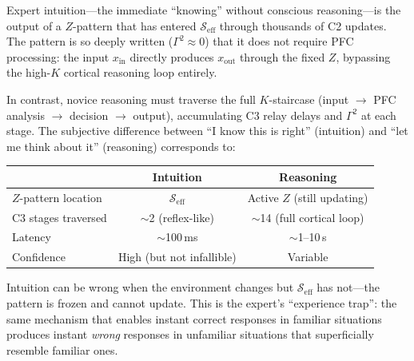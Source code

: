 \documentclass[aps,pre,twocolumn,superscriptaddress,floatfix]{revtex4-2}
\begin{document}
\begin{remark}
\label{rem:intuition}
Expert intuition---the immediate ``knowing'' without
conscious reasoning---is the output of a $Z$-pattern
that has entered $\mathcal{S}_{\text{eff}}$ through
thousands of C2 updates.
The pattern is so deeply written ($\Gamma^2 \approx 0$)
that it does not require PFC processing: the input
$x_{\text{in}}$ directly produces $x_{\text{out}}$
through the fixed $Z$, bypassing the high-$K$ cortical
reasoning loop entirely.

In contrast, novice reasoning must traverse the full
$K$-staircase (input $\to$ PFC analysis $\to$ decision
$\to$ output), accumulating C3 relay delays and
$\Gamma^2$ at each stage.
The subjective difference between ``I know this is
right'' (intuition) and ``let me think about it''
(reasoning) corresponds to:
\begin{center}
\begin{tabular}{lcc}
\toprule
& Intuition & Reasoning \\
\midrule
$Z$-pattern location & $\mathcal{S}_{\text{eff}}$ &
  Active $Z$ (still updating) \\
C3 stages traversed & $\sim$2 (reflex-like) &
  $\sim$14 (full cortical loop) \\
Latency & $\sim$100\,ms & $\sim$1--10\,s \\
Confidence & High (but not infallible) & Variable \\
\bottomrule
\end{tabular}
\end{center}
Intuition can be wrong when the environment changes but
$\mathcal{S}_{\text{eff}}$ has not---the pattern is
frozen and cannot update.
This is the expert's ``experience trap'': the same
mechanism that enables instant correct responses in
familiar situations produces instant \emph{wrong}
responses in unfamiliar situations that superficially
resemble familiar ones.
\end{remark}
\end{document}
